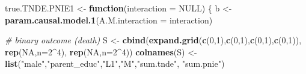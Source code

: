 \documentclass[
]{book}
\newenvironment{Shaded}{\begin{snugshade}}{\end{snugshade}}
\newcommand{\AttributeTok}[1]{\textcolor[rgb]{0.13,0.29,0.53}{#1}}
\newcommand{\CommentTok}[1]{\textcolor[rgb]{0.56,0.35,0.01}{\textit{#1}}}
\newcommand{\ConstantTok}[1]{\textcolor[rgb]{0.56,0.35,0.01}{#1}}
\newcommand{\ControlFlowTok}[1]{\textcolor[rgb]{0.13,0.29,0.53}{\textbf{#1}}}
\newcommand{\DecValTok}[1]{\textcolor[rgb]{0.00,0.00,0.81}{#1}}
\newcommand{\FunctionTok}[1]{\textcolor[rgb]{0.13,0.29,0.53}{\textbf{#1}}}
\newcommand{\NormalTok}[1]{#1}
\newcommand{\OtherTok}[1]{\textcolor[rgb]{0.56,0.35,0.01}{#1}}
\newcommand{\SpecialCharTok}[1]{\textcolor[rgb]{0.81,0.36,0.00}{\textbf{#1}}}
\newcommand{\StringTok}[1]{\textcolor[rgb]{0.31,0.60,0.02}{#1}}
\begin{document}
\begin{Shaded}
\begin{Highlighting}[]
\NormalTok{true.TNDE.PNIE1 }\OtherTok{\textless{}{-}} \ControlFlowTok{function}\NormalTok{(}\AttributeTok{interaction =} \ConstantTok{NULL}\NormalTok{) \{}
\NormalTok{  b }\OtherTok{\textless{}{-}} \FunctionTok{param.causal.model.1}\NormalTok{(}\AttributeTok{A.M.interaction =}\NormalTok{ interaction)}
  
  \CommentTok{\# binary outcome (death)}
\NormalTok{  S }\OtherTok{\textless{}{-}} \FunctionTok{cbind}\NormalTok{(}\FunctionTok{expand.grid}\NormalTok{(}\FunctionTok{c}\NormalTok{(}\DecValTok{0}\NormalTok{,}\DecValTok{1}\NormalTok{),}\FunctionTok{c}\NormalTok{(}\DecValTok{0}\NormalTok{,}\DecValTok{1}\NormalTok{),}\FunctionTok{c}\NormalTok{(}\DecValTok{0}\NormalTok{,}\DecValTok{1}\NormalTok{),}\FunctionTok{c}\NormalTok{(}\DecValTok{0}\NormalTok{,}\DecValTok{1}\NormalTok{)), }\FunctionTok{rep}\NormalTok{(}\ConstantTok{NA}\NormalTok{,}\AttributeTok{n=}\DecValTok{2}\SpecialCharTok{\^{}}\DecValTok{4}\NormalTok{), }\FunctionTok{rep}\NormalTok{(}\ConstantTok{NA}\NormalTok{,}\AttributeTok{n=}\DecValTok{2}\SpecialCharTok{\^{}}\DecValTok{4}\NormalTok{))}
  \FunctionTok{colnames}\NormalTok{(S) }\OtherTok{\textless{}{-}} \FunctionTok{list}\NormalTok{(}\StringTok{"male"}\NormalTok{,}\StringTok{"parent\_educ"}\NormalTok{,}\StringTok{"L1"}\NormalTok{,}\StringTok{"M"}\NormalTok{,}\StringTok{"sum.tnde"}\NormalTok{, }\StringTok{"sum.pnie"}\NormalTok{)}
  

\end{Highlighting}
\end{Shaded}
\end{document}

